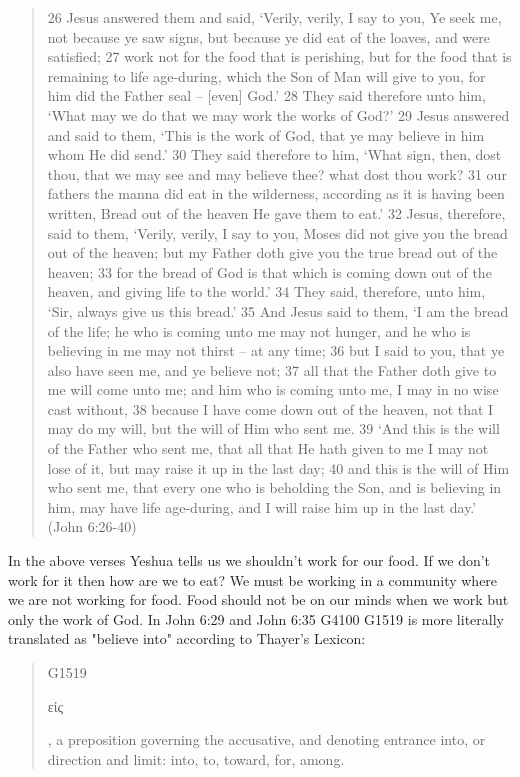 \documentclass[11pt]{article}
\begin{document}
\begin{quote}
26 Jesus answered them and said, `Verily, verily, I say to you, Ye seek me, not because ye saw signs, but because ye did eat of the loaves, and were satisfied;
27 work not for the food that is perishing, but for the food that is remaining to life age-during, which the Son of Man will give to you, for him did the Father seal -- [even] God.'
28 They said therefore unto him, `What may we do that we may work the works of God?'
29 Jesus answered and said to them, `This is the work of God, that ye may believe in him whom He did send.'
30 They said therefore to him, `What sign, then, dost thou, that we may see and may believe thee? what dost thou work?
31 our fathers the manna did eat in the wilderness, according as it is having been written, Bread out of the heaven He gave them to eat.'
32 Jesus, therefore, said to them, `Verily, verily, I say to you, Moses did not give you the bread out of the heaven; but my Father doth give you the true bread out of the heaven;
33 for the bread of God is that which is coming down out of the heaven, and giving life to the world.'
34 They said, therefore, unto him, `Sir, always give us this bread.'
35 And Jesus said to them, `I am the bread of the life; he who is coming unto me may not hunger, and he who is believing in me may not thirst -- at any time;
36 but I said to you, that ye also have seen me, and ye believe not;
37 all that the Father doth give to me will come unto me; and him who is coming unto me, I may in no wise cast without,
38 because I have come down out of the heaven, not that I may do my will, but the will of Him who sent me.
39 `And this is the will of the Father who sent me, that all that He hath given to me I may not lose of it, but may raise it up in the last day;
40 and this is the will of Him who sent me, that every one who is beholding the Son, and is believing in him, may have life age-during, and I will raise him up in the last day.' (John 6:26-40)
\end{quote}
In the above verses Yeshua tells us we shouldn't work for our food. If we don't work for it then how are we to eat? We must be working in a community where we are not working for food. Food should not be on our minds when we work but only the work of God. In John 6:29 and John 6:35 G4100 G1519 is more literally translated as "believe into" according to Thayer's Lexicon: 
\begin{quote}
G1519 \begin{greek} εἰς \end{greek}, a preposition governing the accusative, and denoting entrance into, or direction and limit: into, to, toward, for, among.
\end{quote}
\end{document}

